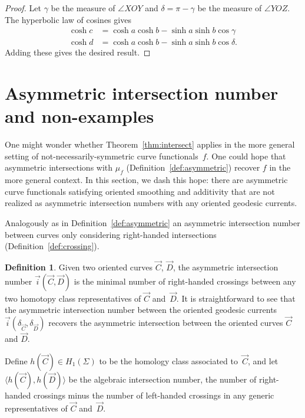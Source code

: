 \documentclass[11pt]{amsart}
\numberwithin{equation}{section}
\numberwithin{figure}{section}
\theoremstyle{definition}
\newtheorem{definition}[theorem]{Definition}
\theoremstyle{plain}
\begin{document}
\begin{proof}
  Let $\gamma$ be the measure of $\angle XOY$ and $\delta=\pi-\gamma$ be the
  measure of $\angle YOZ$. The hyperbolic law of cosines gives
  \begin{align*}
    \cosh c &= \cosh a \cosh b - \sinh a \sinh b \cos \gamma\\
    \cosh d &= \cosh a \cosh b - \sinh a \sinh b \cos \delta.
  \end{align*}
  Adding these gives the desired result.
\end{proof}


\section{Asymmetric intersection number and non-examples}
\label{sec:asymmetric}
One might wonder whether Theorem~\ref{thm:intersect} applies in the more general setting of
not-necessarily-symmetric curve functionals~$f$. One could hope that
asymmetric intersections with $\mu_f$ (Definition~\ref{def:asymmetric}) recover $f$ in the more
general context. In this section, we dash this hope: there are
asymmetric curve functionals satisfying oriented smoothing and additivity that
are not realized as asymmetric intersection numbers with any oriented
geodesic currents.

Analogously as in Definition~\ref{def:asymmetric} an asymmetric intersection number between curves only considering right-handed intersections (Definition~\ref{def:crossing}).

\begin{definition} Given two oriented curves $\vec C$, $\vec D$, the
  asymmetric intersection number $\vec i(\vec C, \vec D)$ is the
  minimal number of right-handed crossings between any two homotopy
  class representatives of $\vec C$ and~$\vec D$.
  It is straightforward to see that the asymmetric intersection number between the oriented geodesic currents $\vec{i} (\delta_{\vec C}, \delta_{\vec D})$ recovers the asymmetric intersection between the oriented curves $\vec C$ and $\vec D$.
  

  Define $h(\vec C)\in H_1(\Sigma)$ to be the homology class
  associated to~$\vec C$, and let 
  $\langle h(\vec C), h(\vec D)\rangle$ be the algebraic intersection
  number, the number of right-handed crossings minus the number of
  left-handed crossings in any generic representatives of $\vec C$
  and~$\vec D$.
\end{definition}
\end{document}
